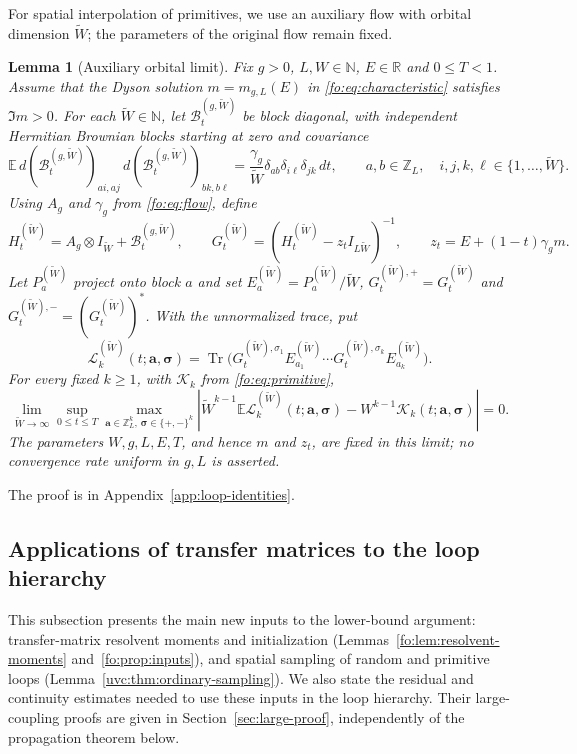 \documentclass[11pt]{article}
\numberwithin{equation}{section}
\newtheorem{lemma}[theorem]{Lemma}
\theoremstyle{remark}
\newcommand{\E}{\mathbb E}
\newcommand{\Z}{\mathbb Z}
\newcommand{\Tr}{\operatorname{Tr}}
\newcommand{\wt}{\widetilde}
\newcommand{\cL}{\mathcal L}
\newcommand{\cK}{\mathcal K}
\begin{document}
For spatial interpolation of primitives, we use an auxiliary flow with
orbital dimension $\wt W$; the parameters of the original flow remain fixed.

\begin{lemma}[Auxiliary orbital limit]\label{uvc:lem:orbital-limit}
Fix $g>0$, $L,W\in\mathbb N$, $E\in\mathbb R$ and $0\le T<1$.
Assume that the Dyson solution $m=m_{g,L}(E)$ in
\eqref{fo:eq:characteristic} satisfies $\Im m>0$.
For each $\wt W\in\mathbb N$, let $\mathcal B_t^{(g,\wt W)}$ be block diagonal,
with independent Hermitian Brownian blocks starting at zero and covariance
\[
 \E\,d(\mathcal B_t^{(g,\wt W)})_{ai,aj}\,
       d(\mathcal B_t^{(g,\wt W)})_{bk,b\ell}
 =\frac{\gamma_g}{\wt W}\delta_{ab}\delta_{i\ell}\delta_{jk}\,dt,
 \qquad a,b\in\Z_L,\quad i,j,k,\ell\in\{1,\ldots,\wt W\}.
\]
Using $A_g$ and $\gamma_g$ from \eqref{fo:eq:flow}, define
\[
 H_t^{(\wt W)}=A_g\otimes I_{\wt W}+\mathcal B_t^{(g,\wt W)},\qquad
 G_t^{(\wt W)}=(H_t^{(\wt W)}-z_tI_{L\wt W})^{-1},\qquad
 z_t=E+(1-t)\gamma_g m.
\]
Let $P_a^{(\wt W)}$ project onto block $a$ and set
$E_a^{(\wt W)}=P_a^{(\wt W)}/\wt W$,
$G_t^{(\wt W),+}=G_t^{(\wt W)}$ and
$G_t^{(\wt W),-}=(G_t^{(\wt W)})^*$.
With the unnormalized trace, put
\[
 \cL_k^{(\wt W)}(t;\boldsymbol a,\boldsymbol\sigma)
 =\Tr\bigl(G_t^{(\wt W),\sigma_1}E_{a_1}^{(\wt W)}\cdots
           G_t^{(\wt W),\sigma_k}E_{a_k}^{(\wt W)}\bigr).
\]
For every fixed $k\ge1$, with $\cK_k$ from \eqref{fo:eq:primitive},
\begin{equation}\label{uvc:eq:orbital-limit}
 \lim_{\wt W\to\infty}\sup_{0\le t\le T}
 \max_{\boldsymbol a\in\Z_L^k,\,\boldsymbol\sigma\in\{+,-\}^k}
 \left|\wt W^{k-1}\E\cL_k^{(\wt W)}(t;\boldsymbol a,\boldsymbol\sigma)
       -W^{k-1}\cK_k(t;\boldsymbol a,\boldsymbol\sigma)\right|=0.
\end{equation}
The parameters $W,g,L,E,T$, and hence $m$ and $z_t$, are fixed in this
limit; no convergence rate uniform in $g,L$ is asserted.
\end{lemma}
The proof is in Appendix~\ref{app:loop-identities}.

\subsection{Applications of transfer matrices to the loop hierarchy}
\label{sec:fo-transfer-hierarchy}
This subsection presents the main new inputs to the lower-bound argument:
transfer-matrix resolvent moments and initialization
(Lemmas~\ref{fo:lem:resolvent-moments} and~\ref{fo:prop:inputs}),
and spatial sampling of random and primitive loops
(Lemma~\ref{uvc:thm:ordinary-sampling}). We also state the residual
and continuity estimates needed to use these inputs in the loop hierarchy.
Their large-coupling proofs are given in Section~\ref{sec:large-proof},
independently of the propagation theorem below.
\end{document}
